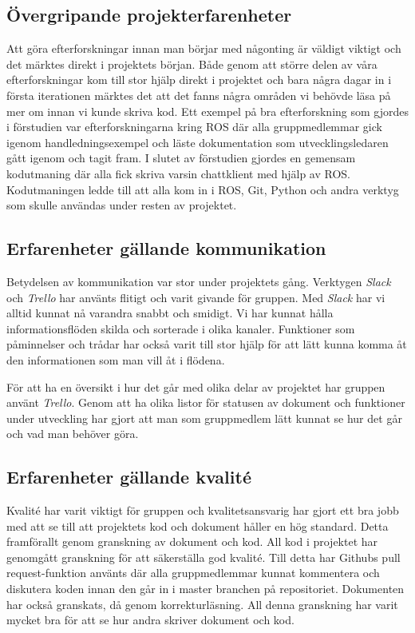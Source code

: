 \subsection{Övergripande projekterfarenheter}

Att göra efterforskningar innan man börjar med någonting är väldigt viktigt och det märktes direkt i projektets början. Både genom att större delen av våra efterforskningar kom till stor hjälp direkt i projektet och bara några dagar in i första iterationen märktes det att det fanns några områden vi behövde läsa på mer om innan vi kunde skriva kod. Ett exempel på bra efterforskning som gjordes i förstudien var efterforskningarna kring ROS där alla gruppmedlemmar gick igenom handledningsexempel och läste dokumentation som utvecklingsledaren gått igenom och tagit fram. I slutet av förstudien gjordes en gemensam kodutmaning där alla fick skriva varsin chattklient med hjälp av ROS. Kodutmaningen ledde till att alla kom in i ROS, Git, Python och andra verktyg som skulle användas under resten av projektet.


\subsection{Erfarenheter gällande kommunikation}

Betydelsen av kommunikation var stor under projektets gång. Verktygen \textit{Slack} och \textit{Trello} har använts flitigt och varit givande för gruppen. Med \textit{Slack} har vi alltid kunnat nå varandra snabbt och smidigt. Vi har kunnat hålla informationsflöden skilda och sorterade i olika kanaler. Funktioner som påminnelser och trådar har också varit till stor hjälp för att lätt kunna komma åt den informationen som man vill åt i flödena.

För att ha en översikt i hur det går med olika delar av projektet har gruppen använt \textit{Trello}. Genom att ha olika listor för statusen av dokument och funktioner under utveckling har gjort att man som gruppmedlem lätt kunnat se hur det går och vad man behöver göra.


\subsection{Erfarenheter gällande kvalité}

Kvalité har varit viktigt för gruppen och kvalitetsansvarig har gjort ett bra jobb med att se till att projektets kod och dokument håller en hög standard. Detta framförallt genom granskning av dokument och kod. All kod i projektet har genomgått granskning för att säkerställa god kvalité. Till detta har Githubs pull request-funktion använts där alla gruppmedlemmar kunnat kommentera och diskutera koden innan den går in i master branchen på repositoriet. Dokumenten har också granskats, då genom korrekturläsning. All denna granskning har varit mycket bra för att se hur andra skriver dokument och kod.


